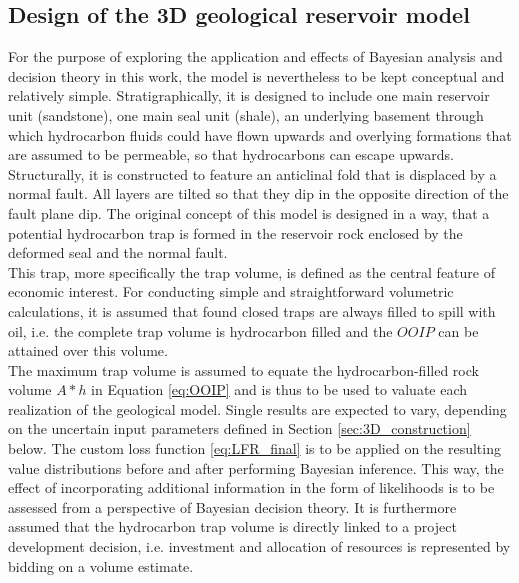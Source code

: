 		\subsection{Design of the 3D geological reservoir model}\label{sec:3D_design}
		For the purpose of exploring the application and effects of Bayesian analysis and decision theory in this work, the model is nevertheless to be kept conceptual and relatively simple. Stratigraphically, it is designed to include one main reservoir unit (sandstone), one main seal unit (shale), an underlying basement through which hydrocarbon fluids could have flown upwards and overlying formations that are assumed to be permeable, so that hydrocarbons can escape upwards. Structurally, it is constructed to feature an anticlinal fold that is displaced by a normal fault. All layers are tilted so that they dip in the opposite direction of the fault plane dip. The original concept of this model is designed in a way, that a potential hydrocarbon trap is formed in the reservoir rock enclosed by the deformed seal and the normal fault.\\
		This trap, more specifically the trap volume, is defined as the central feature of economic interest. For conducting simple and straightforward volumetric calculations, it is assumed that found closed traps are always filled to spill with oil, i.e. the complete trap volume is hydrocarbon filled and the $OOIP$ can be attained over this volume.\\
		The maximum trap volume is assumed to equate the hydrocarbon-filled rock volume $A * h$ in Equation \ref{eq:OOIP} and is thus to be used to valuate each realization of the geological model. Single results are expected to vary, depending on the uncertain input parameters defined in Section \ref{sec:3D_construction} below. The custom loss function \ref{eq:LFR_final} is to be applied on the resulting value distributions before and after performing Bayesian inference. This way, the effect of incorporating additional information in the form of likelihoods is to be assessed from a perspective of Bayesian decision theory. It is furthermore assumed that the hydrocarbon trap volume is directly linked to a project development decision, i.e. investment and allocation of resources is represented by bidding on a volume estimate.
		
